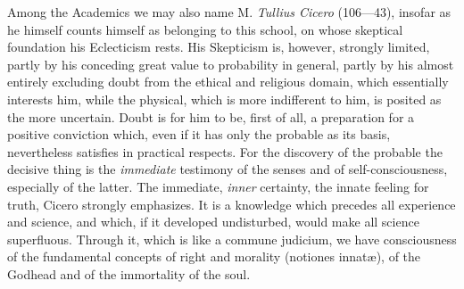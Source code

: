Among the Academics we may also name M. \emph{Tullius
Cicero} (106---43), insofar as he himself counts himself as belonging to this
school, on whose skeptical foundation his Eclecticism rests.
His Skepticism is, however, strongly limited, partly by his
conceding great value to probability in general, partly by his almost entirely excluding doubt from the ethical
and religious domain, which essentially interests him, while the
physical, which is more indifferent to him, is posited as the more uncertain.
Doubt is for him to be, first of all, a preparation for a positive conviction which, even if it has only the probable as its basis,
nevertheless satisfies in practical respects. For the discovery of the probable the decisive thing is the \emph{immediate} testimony of the senses and of
self-consciousness, especially of the
latter. The immediate, \emph{inner} certainty, the innate feeling for truth, Cicero strongly emphasizes. It is a knowledge
which precedes all experience and science, and which, if
it developed undisturbed, would make all science superfluous.
Through it, which is like a commune judicium, we have consciousness of the fundamental concepts of right and morality (notiones
innatæ), of the Godhead and of the immortality of the soul.

